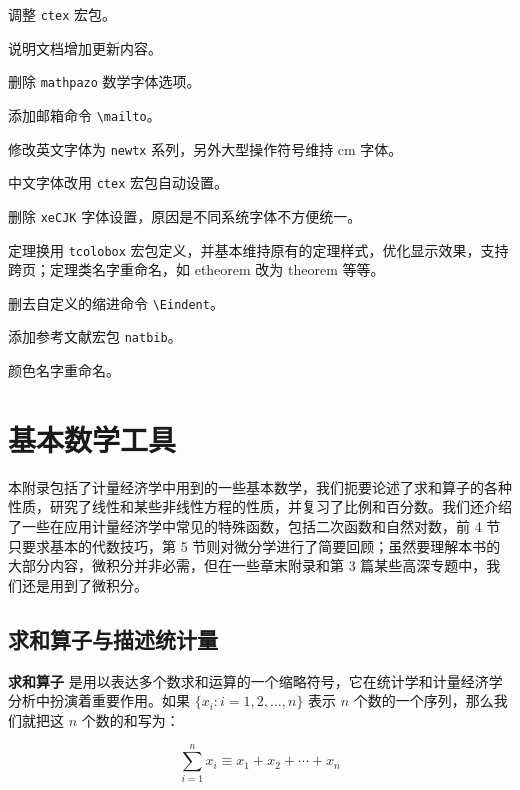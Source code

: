 \documentclass[cn,10pt,math=newtx,citestyle=gb7714-2015,bibstyle=gb7714-2015]{elegantbook}
\begin{document}

\begin{change}
  \item 调整 \lstinline{ctex} 宏包。
  \item 说明文档增加更新内容。
\end{change}


\begin{change}
  \item 删除 \lstinline{mathpazo} 数学字体选项。
  \item 添加邮箱命令 \lstinline{\mailto}。
  \item 修改英文字体为 \lstinline{newtx} 系列，另外大型操作符号维持 cm 字体。
  \item 中文字体改用 \lstinline{ctex} 宏包自动设置。
  \item 删除 \lstinline{xeCJK} 字体设置，原因是不同系统字体不方便统一。
  \item 定理换用 \lstinline{tcolobox} 宏包定义，并基本维持原有的定理样式，优化显示效果，支持跨页；定理类名字重命名，如 etheorem 改为 theorem 等等。
  \item 删去自定义的缩进命令 \lstinline{\Eindent}。
  \item 添加参考文献宏包 \lstinline{natbib}。
  \item 颜色名字重命名。
\end{change}

\nocite{*} 
\printbibliography
\appendix

\chapter{基本数学工具}


本附录包括了计量经济学中用到的一些基本数学，我们扼要论述了求和算子的各种性质，研究了线性和某些非线性方程的性质，并复习了比例和百分数。我们还介绍了一些在应用计量经济学中常见的特殊函数，包括二次函数和自然对数，前 4 节只要求基本的代数技巧，第 5 节则对微分学进行了简要回顾；虽然要理解本书的大部分内容，微积分并非必需，但在一些章末附录和第 3 篇某些高深专题中，我们还是用到了微积分。

\section{求和算子与描述统计量}

\textbf{求和算子} 是用以表达多个数求和运算的一个缩略符号，它在统计学和计量经济学分析中扮演着重要作用。如果 $\{x_i: i=1, 2, \ldots, n\}$ 表示 $n$ 个数的一个序列，那么我们就把这 $n$ 个数的和写为：

\begin{equation}
\sum_{i=1}^n x_i \equiv x_1 + x_2 +\cdots + x_n
\end{equation}
\end{document}
